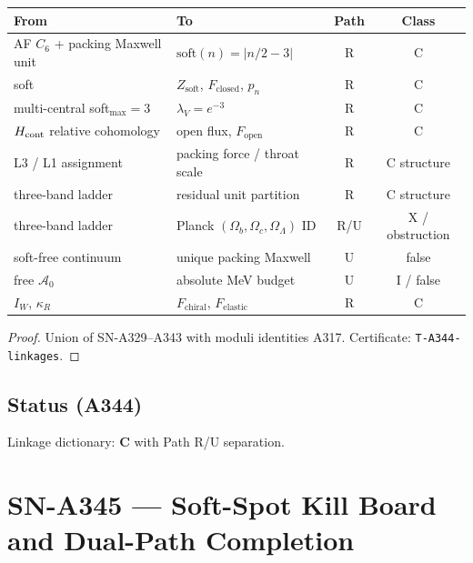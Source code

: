 \begin{theorem}
\label{thm:A344}
\begin{center}
\begin{tabular}{@{}p{4.2cm}p{4.0cm}cc@{}}
\toprule
From & To & Path & Class \\
\midrule
AF $C_6$ + packing Maxwell unit & $\mathrm{soft}(n)=|n/2-3|$ & R & C \\
soft & $Z_{\mathrm{soft}}$, $F_{\mathrm{closed}}$, $p_n$ & R & C \\
multi-central soft$_{\max}=3$ & $\lambda_V=e^{-3}$ & R & C \\
$H_{\rm cont}$ relative cohomology & open flux, $F_{\mathrm{open}}$ & R & C \\
L3 / L1 assignment & packing force / throat scale & R & C structure \\
three-band ladder & residual unit partition & R & C structure \\
three-band ladder & Planck $(\Omega_b,\Omega_c,\Omega_\Lambda)$ ID & R/U & X / obstruction \\
soft-free continuum & unique packing Maxwell & U & false \\
free $\mathcal{A}_0$ & absolute MeV budget & U & I / false \\
$I_W$, $\kappa_R$ & $F_{\mathrm{chiral}}$, $F_{\mathrm{elastic}}$ & R & C \\
\bottomrule
\end{tabular}
\end{center}
\end{theorem}

\begin{proof}
Union of SN-A329--A343 with moduli identities A317. Certificate: \texttt{T-A344-linkages}.
\end{proof}

\subsection*{Status (A344)}
Linkage dictionary: \textbf{C} with Path R/U separation.

\section{SN-A345 --- Soft-Spot Kill Board and Dual-Path Completion}
\label{sec:SN-A345}

